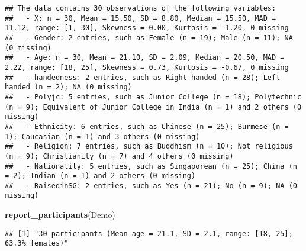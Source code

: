 \documentclass[
]{article}
\newenvironment{Shaded}{\begin{snugshade}}{\end{snugshade}}
\newcommand{\DataTypeTok}[1]{\textcolor[rgb]{0.13,0.29,0.53}{#1}}
\newcommand{\DecValTok}[1]{\textcolor[rgb]{0.00,0.00,0.81}{#1}}
\newcommand{\KeywordTok}[1]{\textcolor[rgb]{0.13,0.29,0.53}{\textbf{#1}}}
\newcommand{\NormalTok}[1]{#1}
\newcommand{\OperatorTok}[1]{\textcolor[rgb]{0.81,0.36,0.00}{\textbf{#1}}}
\newcommand{\StringTok}[1]{\textcolor[rgb]{0.31,0.60,0.02}{#1}}
\begin{document}
\begin{verbatim}
## The data contains 30 observations of the following variables:
##   - X: n = 30, Mean = 15.50, SD = 8.80, Median = 15.50, MAD = 11.12, range: [1, 30], Skewness = 0.00, Kurtosis = -1.20, 0 missing
##   - Gender: 2 entries, such as Female (n = 19); Male (n = 11); NA (0 missing)
##   - Age: n = 30, Mean = 21.10, SD = 2.09, Median = 20.50, MAD = 2.22, range: [18, 25], Skewness = 0.73, Kurtosis = -0.67, 0 missing
##   - handedness: 2 entries, such as Right handed (n = 28); Left handed (n = 2); NA (0 missing)
##   - Polyjc: 5 entries, such as Junior College (n = 18); Polytechnic (n = 9); Equivalent of Junior College in India (n = 1) and 2 others (0 missing)
##   - Ethnicity: 6 entries, such as Chinese (n = 25); Burmese (n = 1); Caucasian (n = 1) and 3 others (0 missing)
##   - Religion: 7 entries, such as Buddhism (n = 10); Not religious (n = 9); Christianity (n = 7) and 4 others (0 missing)
##   - Nationality: 5 entries, such as Singaporean (n = 25); China (n = 2); Indian (n = 1) and 2 others (0 missing)
##   - RaisedinSG: 2 entries, such as Yes (n = 21); No (n = 9); NA (0 missing)
\end{verbatim}

\begin{Shaded}
\begin{Highlighting}[]
\KeywordTok{report_participants}\NormalTok{(Demo)}
\end{Highlighting}
\end{Shaded}

\begin{verbatim}
## [1] "30 participants (Mean age = 21.1, SD = 2.1, range: [18, 25]; 63.3% females)"
\end{verbatim}

\begin{Shaded}
\end{Shaded}
\end{document}
